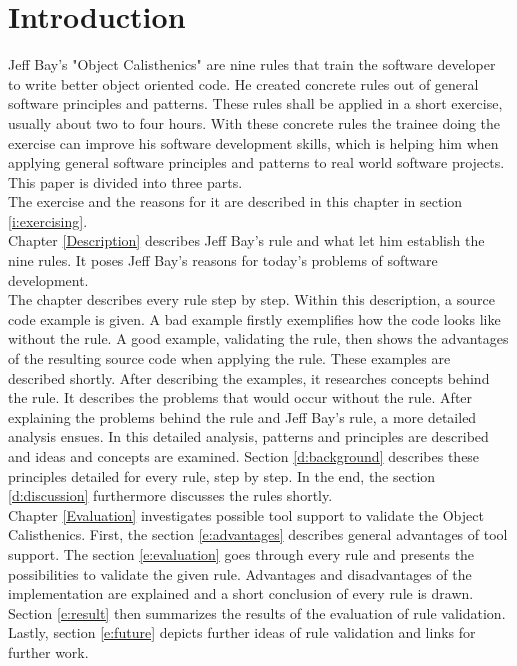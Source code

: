 \chapter{Introduction}
Jeff Bay's "Object Calisthenics" \cite{oc2008} are nine rules that train the software developer to write better object oriented code.  He created concrete rules out of general software principles and patterns. These rules shall be applied in a short exercise, usually about two to four hours. With these concrete rules the trainee doing the exercise can improve his software development skills, which is helping him when applying general software principles and patterns to real world software projects. 
This paper is divided into three parts.\\
The exercise and the reasons for it are described in this chapter in section \ref{i:exercising}.\\

Chapter \ref{Description} describes Jeff Bay's rule and what let him establish the nine rules. It poses Jeff Bay's reasons for today's problems of software development.\\

The chapter describes every rule step by step. Within this description, a source code example is given. A bad example firstly exemplifies how the code looks like without the rule. A good example, validating the rule, then shows the advantages of the resulting source code when applying the rule. These examples are described shortly. After describing the examples, it researches concepts behind the rule. It describes the problems that would occur without the rule. After explaining the problems behind the rule and Jeff Bay's rule, a more detailed analysis ensues. In this detailed analysis, patterns and principles are described and ideas and concepts are examined. Section \ref{d:background} describes these principles detailed for every rule, step by step. In the end, the section \ref{d:discussion} furthermore discusses the rules shortly.\\

Chapter \ref{Evaluation} investigates possible tool support to validate the Object Calisthenics. First, the section \ref{e:advantages} describes general advantages of tool support. The section \ref{e:evaluation} goes through every rule and presents the possibilities to validate the given rule. Advantages and disadvantages of the implementation are explained and a short conclusion of every rule is drawn. Section \ref{e:result} then summarizes the results of the evaluation of rule validation. Lastly, section \ref{e:future} depicts further ideas of rule validation and links for further work.\\

